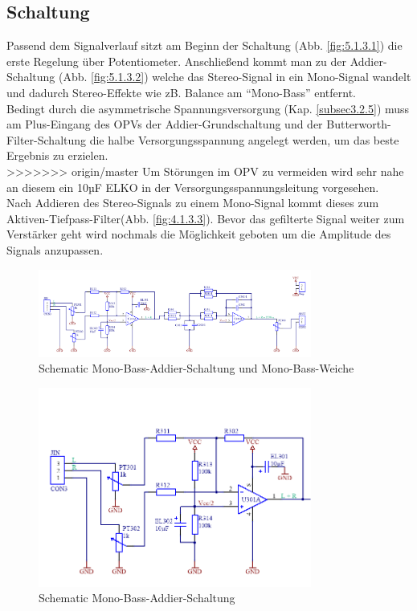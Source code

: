 \subsection{Schaltung}\label{subsec:5.1.3}
Passend dem Signalverlauf sitzt am Beginn der Schaltung (Abb. \ref{fig:5.1.3.1}) die erste Regelung über Potentiometer. Anschließend kommt man zu der Addier-Schaltung (Abb. \ref{fig:5.1.3.2}) welche das Stereo-Signal in ein Mono-Signal wandelt und dadurch Stereo-Effekte wie zB. Balance am \enquote{Mono-Bass} entfernt.\\
Bedingt durch die asymmetrische Spannungsversorgung (Kap. \ref{subsec3.2.5}) muss am Plus-Eingang des OPVs der Addier-Grundschaltung und der Butterworth-Filter-Schaltung die halbe Versorgungsspannung angelegt werden, um das beste Ergebnis zu erzielen.\\
>>>>>>> origin/master
Um Störungen im OPV zu vermeiden wird sehr nahe an diesem ein 10µF ELKO in der Versorgungsspannungsleitung vorgesehen.\\
Nach Addieren des Stereo-Signals zu einem Mono-Signal kommt dieses zum Aktiven-Tiefpass-Filter(Abb. \ref{fig:4.1.3.3}). Bevor das gefilterte Signal weiter zum Verstärker geht wird nochmals die Möglichkeit geboten um die Amplitude des Signals anzupassen.
\begin{figure} [H]
	\centering
	\includegraphics[width=0.8\textwidth]{img/Print3/3mTTWeicheruAddiererDiplSchematic.PNG}
	\caption{Schematic Mono-Bass-Addier-Schaltung und Mono-Bass-Weiche}
	\label {fig:4.1.3.1}
\end{figure}
\begin{figure} [H]
	\centering
	\includegraphics[width=0.8\textwidth]{img/Print3/3mTTWeicheruAddiererDiplSchematicTeil1.png}
	\caption{Schematic Mono-Bass-Addier-Schaltung}
	\label {fig:4.1.3.2}
\end{figure}
